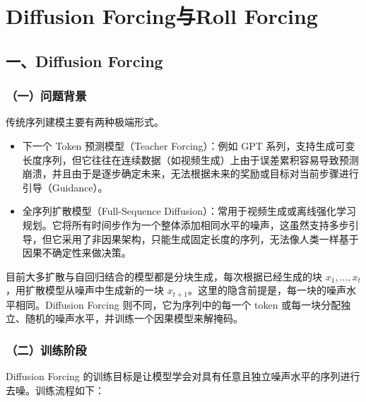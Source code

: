 \setcounter{section}{4}

\hypertarget{diffusion-forcingux4e0eroll-forcing}{%
\section{Diffusion Forcing与Roll Forcing}\label{diffusion-forcingux4e0eroll-forcing}}

\hypertarget{ux4e00diffusion-forcing}{%
\subsection{一、Diffusion Forcing}\label{ux4e00diffusion-forcing}}

\hypertarget{ux4e00ux95eeux9898ux80ccux666f-2}{%
\subsubsection{（一）问题背景}\label{ux4e00ux95eeux9898ux80ccux666f-2}}

传统序列建模主要有两种极端形式。

\begin{itemize}
\tightlist
\item
  下一个 Token 预测模型（Teacher Forcing）：例如 GPT 系列，支持生成可变长度序列，但它往往在连续数据（如视频生成）上由于误差累积容易导致预测崩溃，并且由于是逐步确定未来，无法根据未来的奖励或目标对当前步骤进行引导（Guidance）。
\item
  全序列扩散模型（Full-Sequence Diffusion）：常用于视频生成或离线强化学习规划。它将所有时间步作为一个整体添加相同水平的噪声，这虽然支持多步引导，但它采用了非因果架构，只能生成固定长度的序列，无法像人类一样基于因果不确定性来做决策。
\end{itemize}

目前大多扩散与自回归结合的模型都是分块生成，每次根据已经生成的块 \(x_1,\ldots,x_t\)，用扩散模型从噪声中生成新的一块 \(x_{t+1}\)。这里的隐含前提是，每一块的噪声水平相同。Diffusion Forcing 则不同，它为序列中的每一个 token 或每一块分配独立、随机的噪声水平，并训练一个因果模型来解掩码。

\hypertarget{ux4e8cux8badux7ec3ux9636ux6bb5}{%
\subsubsection{（二）训练阶段}\label{ux4e8cux8badux7ec3ux9636ux6bb5}}

Diffusion Forcing 的训练目标是让模型学会对具有任意且独立噪声水平的序列进行去噪。训练流程如下：

